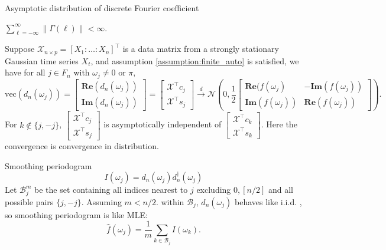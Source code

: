 \documentclass[handout,xcolor={usenames,dvipsnames}]{beamer}
\begin{document}
\begin{frame}{Asymptotic distribution of discrete Fourier coefficient}
\begin{assumption}\label{assumption:finite_auto}
	$\sum_{\ell=-\infty}^\infty \|\Gamma(\ell)\|<\infty$. 
\end{assumption}

\begin{lem}
	\label{lemma:asy_dis_dft}
	Suppose $\mathcal{\mathcal{X}}_{n\times p} = [X_1:\ldots:X_n]^\top$ is a data matrix from a strongly stationary Gaussian time series $X_t$, and assumption \ref{assumption:finite_auto} is satisfied, we have for all $j\in F_n$ with $\omega_j \neq 0$ or $\pi$, 
	\small 
	\begin{equation}
	\label{eq:limiting_dist}
	\text{vec}(d_n(\omega_j)) = 
	\begin{bmatrix}
	\mathbf{Re}(d_n(\omega_j))\\
	\mathbf{Im}(d_n(\omega_j))
	\end{bmatrix}=
	\begin{bmatrix} 
	\mathcal{X}^\top c_j\\
	\mathcal{X}^\top s_j
	\end{bmatrix}  \overset{d}{\rightarrow} \mathcal{N}\left(0, \frac{1}{2}\begin{bmatrix}
	\mathbf{Re}(f(\omega_j) & -\mathbf{Im}(f(\omega_j))\\
	\mathbf{Im}(f(\omega_j)) & \mathbf{Re}(f(\omega_j))
	\end{bmatrix}
	\right).
	\end{equation}
	For $k \notin \{j, -j\}$,  
	$\begin{bmatrix}
	\mathcal{X}^\top c_j\\
	\mathcal{X}^\top s_j
	\end{bmatrix}$ is asymptotically independent of 
	$\begin{bmatrix}
	\mathcal{X}^\top c_k\\
	\mathcal{X}^\top s_k
	\end{bmatrix} $. Here the convergence is convergence in distribution. 
\end{lem} 
\end{frame}


\begin{frame}{Smoothing periodogram}
\[
I(\omega_j) = d_n(\omega_j) d^\dag_n(\omega_j)
\]
Let $\mathcal{B}_j^m$ be the set containing all indices nearest to $j$ excluding $0, [n/2]$ and all possible pairs $\{j, -j\}$. Assuming $m<n/2$.
 within $\mathcal{B}_j$, $d_n(\omega_j)$ behaves like i.i.d. , so smoothing periodogram is like MLE:
\[
\hat{f}(\omega_j) = \frac{1}{m} \sum_{k\in \mathcal{B}_j} I(\omega_k).
\]
\end{frame}
\end{document}
